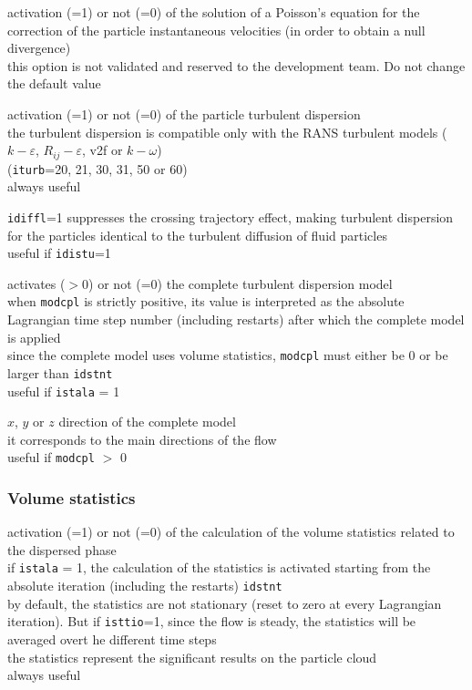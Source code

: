 {activation (=1) or not (=0) of the solution of a Poisson's equation for
the correction of the particle instantaneous velocities (in order to obtain a
null divergence)\\
this option is not validated and reserved to the development team. Do not change
the default value}

{activation (=1) or not (=0) of the particle turbulent dispersion\\
the turbulent dispersion is compatible only with the RANS turbulent models
($k-\varepsilon$, $R_{ij}-\varepsilon$, v2f or $k-\omega$)\\
(\texttt{iturb}=20, 21, 30, 31, 50 or 60)\\
always useful}

{\texttt{idiffl}=1 suppresses the crossing trajectory effect, making
turbulent dispersion for the particles identical to the turbulent
diffusion of fluid particles\\
useful if \texttt{idistu}=1}

{activates ($>$0) or not (=0) the complete turbulent dispersion model\\
when \texttt{modcpl} is strictly positive, its value is interpreted as the
absolute Lagrangian time step number (including restarts) after which the
complete model is applied\\
since the complete model uses volume statistics, \texttt{modcpl} must
either be 0 or be larger than \texttt{idstnt}\\
useful if \texttt{istala} = 1}

{$x$, $y$ or $z$ direction of the complete model\\
it corresponds to the main directions of the flow\\
useful if \texttt{modcpl} $>$ 0}

\subsubsection{Volume statistics}

{activation (=1) or not (=0) of the calculation of the volume
statistics related to the dispersed phase\\
if \texttt{istala} = 1, the calculation of the statistics is activated
starting from the absolute iteration (including the restarts) \texttt{idstnt}\\
by default, the statistics are not stationary (reset to zero at every
Lagrangian iteration). But if \texttt{isttio}=1, since the flow is steady,
the statistics will be averaged overt he different time steps\\
the statistics represent the significant results on the particle cloud\\
always useful}


